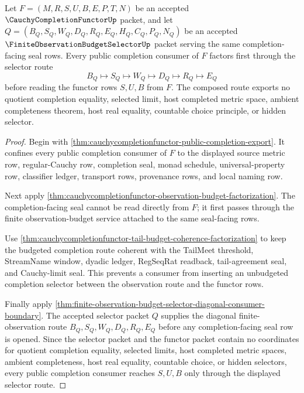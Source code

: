 \begin{theorem}
\label{thm:cauchycompletionfunctor-finite-observation-selector-factorization}
Let $F=(M,R,S,U,B,E,P,T,N)$ be an accepted $\CauchyCompletionFunctorUp$ packet, and let $Q=(B_Q,S_Q,W_Q,D_Q,R_Q,E_Q,H_Q,C_Q,P_Q,N_Q)$ be an accepted $\FiniteObservationBudgetSelectorUp$ packet serving the same completion-facing seal rows. Every public completion consumer of $F$ factors first through the selector route
$$
B_Q \longmapsto S_Q \longmapsto W_Q \longmapsto D_Q \longmapsto R_Q \longmapsto E_Q
$$
before reading the functor rows $S,U,B$ from $F$. The composed route exports no quotient completion equality, selected limit, host completed metric space, ambient completeness theorem, host real equality, countable choice principle, or hidden selector.
\end{theorem}
\begin{proof}
Begin with \autoref{thm:cauchycompletionfunctor-public-completion-export}. It confines every public completion consumer of $F$ to the displayed source metric row, regular-Cauchy row, completion seal, monad schedule, universal-property row, classifier ledger, transport rows, provenance rows, and local naming row.

Next apply \autoref{thm:cauchycompletionfunctor-observation-budget-factorization}. The completion-facing seal cannot be read directly from $F$; it first passes through the finite observation-budget service attached to the same seal-facing rows.

Use \autoref{thm:cauchycompletionfunctor-tail-budget-coherence-factorization} to keep the budgeted completion route coherent with the TailMeet threshold, StreamName window, dyadic ledger, RegSeqRat readback, tail-agreement seal, and Cauchy-limit seal. This prevents a consumer from inserting an unbudgeted completion selector between the observation route and the functor rows.

Finally apply \autoref{thm:finite-observation-budget-selector-diagonal-consumer-boundary}. The accepted selector packet $Q$ supplies the diagonal finite-observation route $B_Q,S_Q,W_Q,D_Q,R_Q,E_Q$ before any completion-facing seal row is opened. Since the selector packet and the functor packet contain no coordinates for quotient completion equality, selected limits, host completed metric spaces, ambient completeness, host real equality, countable choice, or hidden selectors, every public completion consumer reaches $S,U,B$ only through the displayed selector route.
\end{proof}

